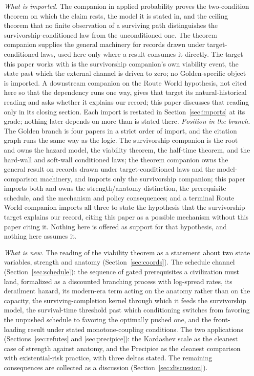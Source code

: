 \documentclass[11pt]{article}
\theoremstyle{plain}
\theoremstyle{definition}
\theoremstyle{remark}
\begin{document}
\emph{What is imported.} The companion in applied probability
\cite{SurvA} proves the two-condition theorem on which the claim rests,
the model it is stated in, and the ceiling theorem that no finite
observation of a surviving path distinguishes the survivorship-conditioned
law from the unconditioned one. The theorem companion \cite{TargetedB1} supplies the general
machinery for records drawn under target-conditioned laws, used here
only where a result consumes it directly. The target this paper works with is the survivorship companion's own
viability event, the state past which the external channel is driven to
zero; no Golden-specific object is imported. A downstream companion on
the Route World hypothesis, not cited here so that the dependency runs
one way, gives that target its natural-historical reading and asks
whether it explains our record; this paper discusses that reading only
in its closing section. Each import is restated in
Section~\ref{sec:imports} at its grade; nothing later depends on more
than is stated there.
\emph{Position in the branch.} The Golden branch is four papers in a
strict order of import, and the citation graph runs the same way as the
logic. The survivorship companion \cite{SurvA} is the root and owns the
hazard model, the viability theorem, the half-time theorem, and the
hard-wall and soft-wall conditioned laws; the theorem companion
\cite{TargetedB1} owns the general result on records drawn under
target-conditioned laws and the model-comparison machinery, and imports
only the survivorship companion; this paper imports both and owns the
strength/anatomy distinction, the prerequisite schedule, and the
mechanism and policy consequences; and a terminal Route World companion
imports all three to state the hypothesis that the survivorship target
explains our record, citing this paper as a possible mechanism without
this paper citing it. Nothing here is offered as support for that
hypothesis, and nothing here assumes it.

\emph{What is new.} The reading of the viability theorem as a statement
about two state variables, strength and anatomy
(Section~\ref{sec:coords}). The schedule channel
(Section~\ref{sec:schedule}): the sequence of gated prerequisites a
civilization must land, formalized as a discounted branching process
with log-spread rates, its derailment hazard, its modern-era term acting
on the anatomy rather than on the capacity, the surviving-completion
kernel through which it feeds the survivorship model, the survival-time
threshold past which conditioning switches from favoring the unpushed
schedule to favoring the optimally pushed one, and the front-loading
result under stated monotone-coupling conditions. The two applications
(Sections~\ref{sec:refutes} and \ref{sec:precipice}): the Kardashev
scale as the cleanest case of strength against anatomy, and the
Precipice as the cleanest comparison with existential-risk practice,
with three deltas stated. The remaining consequences are collected as a
discussion (Section~\ref{sec:discussion}).
\end{document}
